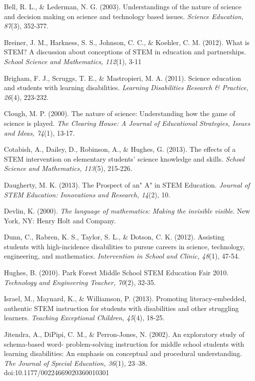 \documentclass[11.5pt]{sig-alternate} %
\begin{document}
Bell, R. L., \& Lederman, N. G. (2003). Understandings of the nature of science 	and decision 	making on science and technology based issues. \textit{Science 	Education, 87}(3), 352-377.

Breiner, J. M., Harkness, S. S., Johnson, C. C., \& Koehler, C. M. (2012). What is STEM? A discussion about conceptions of STEM in education and partnerships. \textit{School Science and Mathematics, 112}(1), 3-11

Brigham, F. J., Scruggs, T. E., \& Mastropieri, M. A. (2011). Science education and students with learning disabilities. \textit{Learning Disabilities Research \& Practice, 26}(4), 223-232.

Clough, M. P. (2000). The nature of science: Understanding how the game of science is played. \textit{The Clearing House: A Journal of Educational Strategies, Issues and Ideas, 74}(1), 13-17.

Cotabish, A., Dailey, D., Robinson, A., \& Hughes, G. (2013). The effects of a STEM intervention on elementary students' science knowledge and skills. \textit{School Science and Mathematics, 113}(5), 215-226.

Daugherty, M. K. (2013). The Prospect of an" A" in STEM Education. \textit{Journal of STEM Education: Innovations and Research, 14}(2), 10.

Devlin, K. (2000). \textit{The language of mathematics: Making the invisible visible}. New York, NY: Henry Holt and Company.

Dunn, C., Rabren, K. S., Taylor, S. L., \& Dotson, C. K. (2012). Assisting students with high-incidence disabilities to pursue careers in science, technology, engineering, and mathematics. \textit{Intervention in School and Clinic, 48}(1), 47-54.

Hughes, B. (2010). Park Forest Middle School STEM Education Fair 2010. \textit{Technology and Engineering Teacher, 70}(2), 32-35.

Israel, M., Maynard, K., \& Williamson, P. (2013). Promoting literacy-embedded, authentic STEM instruction for students with disabilities and other struggling learners. \textit{Teaching Exceptional Children, 45}(4), 18-25.

Jitendra, A., DiPipi, C. M., \& Perron-Jones, N. (2002). An exploratory study of schema-based word- problem-solving instruction for middle school students with learning disabilities: An emphasis on conceptual and procedural understanding. \textit{The Journal of Special Education, 36}(1), 23–38. doi:10.1177/00224669020360010301
\end{document}
